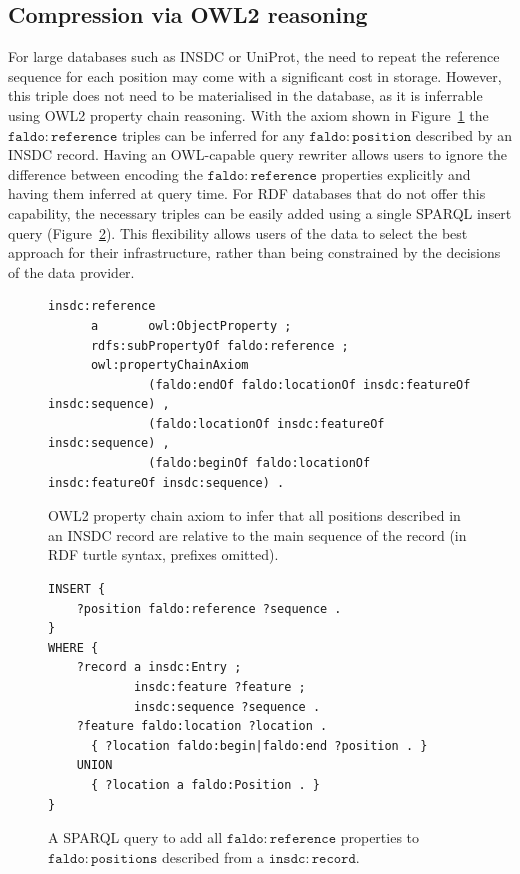 \subsection*{Compression via OWL2 reasoning}
For large databases such as INSDC or UniProt,
the need to repeat the reference sequence for each position may come with a significant cost in storage.
However, this triple does not need to be materialised in the database, as it is inferrable using OWL2 property chain reasoning.
With the axiom shown in Figure~\ref{owl:chainProperty} the $\mathtt{faldo\colon{}reference}$ triples can be inferred for any $\mathtt{faldo\colon{}position}$ described by an INSDC record.
Having an OWL-capable query rewriter allows users to ignore the difference between encoding the $\mathtt{faldo\colon{}reference}$ properties explicitly and having them inferred at query time.
For RDF databases that do not offer this capability,
the necessary triples can be easily added using a single SPARQL insert query (Figure~\ref{sparql:chainProperty}).
This flexibility allows users of the data to select the best approach for their infrastructure, rather than being constrained by the decisions of the data provider.

\begin{figure}
\begin{shaded}
\small
\begin{verbatim}
insdc:reference
      a       owl:ObjectProperty ;
      rdfs:subPropertyOf faldo:reference ;
      owl:propertyChainAxiom
              (faldo:endOf faldo:locationOf insdc:featureOf insdc:sequence) , 
              (faldo:locationOf insdc:featureOf insdc:sequence) , 
              (faldo:beginOf faldo:locationOf insdc:featureOf insdc:sequence) .

\end{verbatim}
\end{shaded}
\caption{OWL2 property chain axiom to infer that all positions described in an INSDC record are relative to the main sequence of the record (in RDF turtle syntax, prefixes omitted).}
\label{owl:chainProperty}
\end{figure}

\begin{figure}
\begin{shaded}
\small
\begin{verbatim}
INSERT {
    ?position faldo:reference ?sequence .
}
WHERE {
    ?record a insdc:Entry ;
            insdc:feature ?feature ;
            insdc:sequence ?sequence .
    ?feature faldo:location ?location .
      { ?location faldo:begin|faldo:end ?position . }
    UNION
      { ?location a faldo:Position . }
}
\end{verbatim}
\end{shaded}
\caption{A SPARQL query to add all $\mathtt{faldo\colon{}reference}$ properties to $\mathtt{faldo\colon{}positions}$ described from a $\mathtt{insdc\colon{}record}$.}
\label{sparql:chainProperty}
\end{figure}

